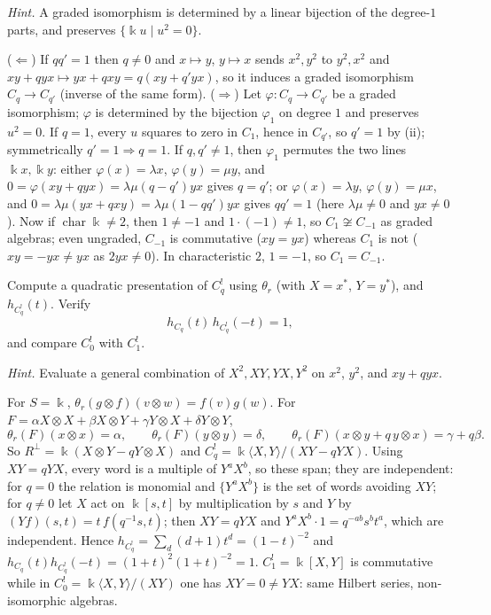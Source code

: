 \documentclass[11pt,a4paper]{exam}
\newcommand{\kk}{\Bbbk}
\begin{document}
\begin{questions}
\begin{parts}
\begin{subparts}
\emph{Hint.} A graded isomorphism is determined by a linear bijection of the degree-$1$ parts, and preserves $\{\kk u\mid u^2=0\}$.
\begin{solution}
($\Leftarrow$) If $qq'=1$ then $q\neq0$ and $x\mapsto y$, $y\mapsto x$ sends $x^2,y^2$ to $y^2,x^2$ and $xy+qyx\mapsto yx+qxy=q(xy+q'yx)$, so it induces a graded isomorphism $C_q\to C_{q'}$ (inverse of the same form).
($\Rightarrow$) Let $\varphi:C_q\to C_{q'}$ be a graded isomorphism; $\varphi$ is determined by the bijection $\varphi_1$ on degree $1$ and preserves $u^2=0$.
If $q=1$, every $u$ squares to zero in $C_1$, hence in $C_{q'}$, so $q'=1$ by (ii); symmetrically $q'=1\Rightarrow q=1$. If $q,q'\neq1$, then $\varphi_1$ permutes the two lines $\kk x,\kk y$:
either $\varphi(x)=\lambda x$, $\varphi(y)=\mu y$, and $0=\varphi(xy+qyx)=\lambda\mu(q-q')yx$ gives $q=q'$; or $\varphi(x)=\lambda y$, $\varphi(y)=\mu x$, and
$0=\lambda\mu(yx+qxy)=\lambda\mu(1-qq')yx$ gives $qq'=1$ (here $\lambda\mu\neq0$ and $yx\neq0$).
Now if $\operatorname{char}\kk\neq2$, then $1\neq-1$ and $1\cdot(-1)\neq1$, so $C_1\not\cong C_{-1}$ as graded algebras; even ungraded, $C_{-1}$ is commutative ($xy=yx$) whereas $C_1$ is not ($xy=-yx\neq yx$ as $2yx\neq0$).
In characteristic $2$, $1=-1$, so $C_1=C_{-1}$.
\end{solution}
\subpart Compute a quadratic presentation of $C_q^!$ using $\theta_r$ (with $X=x^*$, $Y=y^*$), and $h_{C_q^!}(t)$. Verify
\[
  h_{C_q}(t)\,h_{C_q^!}(-t)=1,
\]
and compare $C_0^!$ with $C_1^!$.

\emph{Hint.} Evaluate a general combination of $X^2,XY,YX,Y^2$ on $x^2$, $y^2$, and $xy+qyx$.
\begin{solution}
For $S=\kk$, $\theta_r(g\otimes f)(v\otimes w)=f(v)g(w)$. For $F=\alpha X\otimes X+\beta X\otimes Y+\gamma Y\otimes X+\delta Y\otimes Y$,
\[
  \theta_r(F)(x\otimes x)=\alpha,\qquad\theta_r(F)(y\otimes y)=\delta,\qquad\theta_r(F)(x\otimes y+q\,y\otimes x)=\gamma+q\beta.
\]
So $R^\perp=\kk(X\otimes Y-qY\otimes X)$ and $C_q^!=\kk\langle X,Y\rangle/(XY-qYX)$. Using $XY=qYX$, every word is a multiple of $Y^aX^b$, so these span; they are independent:
for $q=0$ the relation is monomial and $\{Y^aX^b\}$ is the set of words avoiding $XY$; for $q\neq0$ let $X$ act on $\kk[s,t]$ by multiplication by $s$ and $Y$ by $(Yf)(s,t)=t\,f(q^{-1}s,t)$; then $XY=qYX$ and $Y^aX^b\cdot1=q^{-ab}s^bt^a$, which are independent.
Hence $h_{C_q^!}=\sum_d(d+1)t^d=(1-t)^{-2}$ and $h_{C_q}(t)h_{C_q^!}(-t)=(1+t)^2(1+t)^{-2}=1$.
$C_1^!=\kk[X,Y]$ is commutative while in $C_0^!=\kk\langle X,Y\rangle/(XY)$ one has $XY=0\neq YX$: same Hilbert series, non-isomorphic algebras.
\end{solution}
\end{subparts}
\end{parts}

\end{questions}
\end{document}
